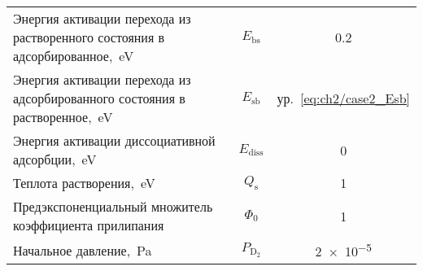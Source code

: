 \begin{table}[t!]
\begin{threeparttable}
\begin{tabularx}{\textwidth}{@{}>{\raggedright}Xcc}
            Энергия активации перехода из растворенного состояния в адсорбированное,~\si{\electronvolt}                 & $E_\mathrm{bs}$       & \num{0.2}                    \\
            Энергия активации перехода из адсорбированного состояния в растворенное,~\si{\electronvolt}                 & $E_\mathrm{sb}$       & ур.~\cref{eq:ch2/case2_Esb}  \\
            Энергия активации диссоциативной адсорбции,~\si{\electronvolt}                                              & $E_\mathrm{diss} $    & 0                            \\
            Теплота растворения,~\si{\electronvolt}                                                                     & $Q_\mathrm{s}$        & 1                            \\
            Предэкспоненциальный множитель коэффициента прилипания                                                      & $\Phi_0$              & 1                            \\
            Начальное давление,~\si{\pascal}                                                                            & $P_\mathrm{D_2}$      & \num{2e-5}                   \\
            \bottomrule
        \end{tabularx}
    \end{threeparttable}
\end{table}

